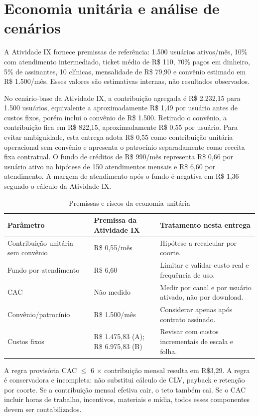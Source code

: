 \section{Economia unitária e análise de cenários}
A Atividade IX fornece premissas de referência: 1.500 usuários ativos/mês, 10\% com atendimento intermediado, ticket médio de R\$ 110, 70\% pagos em dinheiro, 5\% de assinantes, 10 clínicas, mensalidade de R\$ 79,90 e convênio estimado em R\$ 1.500/mês. Esses valores são estimativas internas, não resultados observados.

No cenário-base da Atividade IX, a contribuição agregada é R\$ 2.232,15 para 1.500 usuários, equivalente a aproximadamente R\$ 1,49 por usuário antes de custos fixos, porém inclui o convênio de R\$ 1.500. Retirado o convênio, a contribuição fica em R\$ 822,15, aproximadamente R\$ 0,55 por usuário. Para evitar ambiguidade, esta entrega adota R\$ 0,55 como contribuição unitária operacional sem convênio e apresenta o patrocínio separadamente como receita fixa contratual. O fundo de créditos de R\$ 990/mês representa R\$ 0,66 por usuário ativo na hipótese de 150 atendimentos mensais e R\$ 6,60 por atendimento. A margem de atendimento após o fundo é negativa em R\$ 1,36 segundo o cálculo da Atividade IX.

\begin{table}[H]\centering
\caption{Premissas e riscos da economia unitária}
\begin{tabularx}{\textwidth}{L{4cm}L{3cm}Y}
\toprule
Parâmetro & Premissa da Atividade IX & Tratamento nesta entrega\\\midrule
Contribuição unitária sem convênio & R\$ 0,55/mês & Hipótese a recalcular por coorte.\\
Fundo por atendimento & R\$ 6,60 & Limitar e validar custo real e frequência de uso.\\
CAC & Não medido & Medir por canal e por usuário ativado, não por download.\\
Convênio/patrocínio & R\$ 1.500/mês & Considerar apenas após contrato assinado.\\
Custos fixos & R\$ 1.475,83 (A); R\$ 6.975,83 (B) & Revisar com custos incrementais de escala e folha.\\
\bottomrule
\end{tabularx}
\end{table}

A regra provisória CAC $\leq$ 6 $\times$ contribuição mensal resulta em R\$3,29. A regra é conservadora e incompleta: não substitui cálculo de CLV, payback e retenção por coorte. Se a contribuição mensal efetiva cair, o teto também cai. Se o CAC incluir horas de trabalho, incentivos, materiais e mídia, todos esses componentes devem ser contabilizados.

